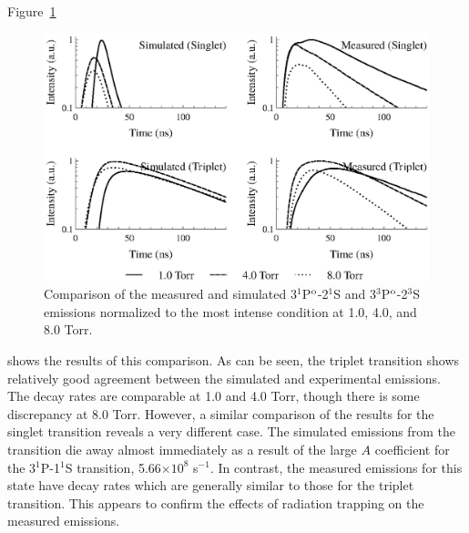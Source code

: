 Figure~\ref{fig:trapping}
\begin{figure}
  \centering
  \includegraphics{./chapters/emissions/figures/trapping.eps}
  \caption{Comparison of the measured and simulated 3$^1$P$^\mathrm{o}$-2$^1$S and
    3$^3$P$^\mathrm{o}$-2$^3$S emissions normalized to the most intense condition at
    1.0, 4.0, and 8.0 Torr.}
  \label{fig:trapping}
\end{figure}
shows the results of this comparison. As can be seen, the triplet transition
shows relatively good agreement between the simulated and experimental
emissions. The decay rates are comparable at 1.0 and 4.0 Torr, though there is
some discrepancy at 8.0 Torr. However, a similar comparison of the results for
the singlet transition reveals a very different case. The simulated emissions
from the transition die away almost immediately as a result of the large $A$
coefficient for the 3$^1$P-1$^1$S transition, 5.66$\times10^{8}$ s$^{-1}$. In
contrast, the measured emissions for this state have decay rates which are
generally similar to those for the triplet transition. This appears to confirm
the effects of radiation trapping on the measured emissions.

